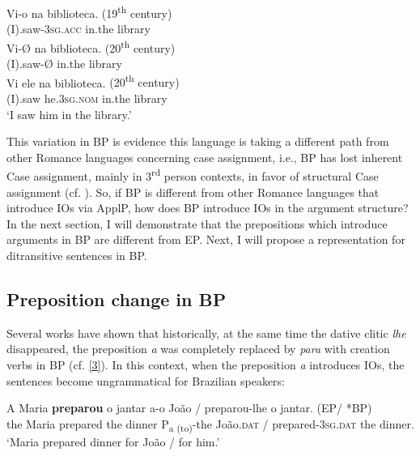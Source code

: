 \documentclass[output=paper,colorlinks,citecolor=brown,nonflat]{./langscibook}
\begin{document}
\ea%
    \label{ex:calindro:10}
    \ea\label{ex:calindro:10a}
    \gll Vi-{o}    na     biblioteca.  \hspace*{8em} {(19\textsuperscript{th} century)}\\
    (I).saw-\textsc{3sg.acc}     in.the     library\\
    \ex\label{ex:calindro:10b}
    \gll Vi-{Ø}    na   biblioteca.   \hspace*{10.5em}   {(20\textsuperscript{th} century)}\\
    (I).saw-Ø  in.the  library\\
    \ex\label{ex:calindro:10c}
    \gll Vi        {ele}                     na        biblioteca.  \hspace*{7em}  {(20\textsuperscript{th} century)}\\
    (I).saw    he.\textsc{3sg.nom}  in.the  library\\
    \glt ‘I saw him in the library.’\hfill \citep[94]{CarvalhoCalindro2018}
    \z
\z

This variation in BP is evidence this language is taking a different path from other Romance languages concerning case assignment, i.e., BP has lost inherent Case assignment, mainly in 3\textsuperscript{rd} person contexts, in favor of structural Case assignment (cf. \citealt{Calindro2015, CarvalhoCalindro2018}). So, if BP is different from other Romance languages that introduce IOs via ApplP, how does BP introduce IOs in the argument structure? In the next section, I will demonstrate that the prepositions which introduce arguments in BP are different from EP. Next, I will propose a representation for ditransitive sentences in BP.

\subsection{Preposition change in BP}\label{sec:calindro:2.2}%

Several works have shown that historically, at the same time the dative clitic \textit{lhe} disappeared, the preposition \textit{a} was completely replaced by \textit{para} with creation verbs in BP (cf. \ref{3}). In this context, when the preposition \textit{a} introduces IOs, the sentences become ungrammatical for Brazilian speakers: 

\ea%
    \label{ex:calindro:11}
    \gll A   Maria \textbf{preparou} o jantar     a-o {João} / preparou-lhe o jantar. \hspace{7cm} (EP/ *BP) \\
    the Maria prepared  the dinner  P{\textsubscript{a (to)}}-the João.\textsc{dat} / prepared-\textsc{3sg.dat} the dinner. { }\\
    \glt `Maria prepared dinner for João / for him.'
    \z
\end{document}
